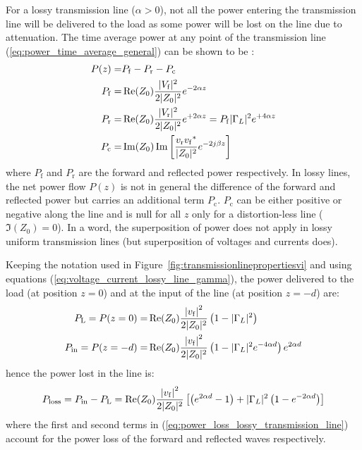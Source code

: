 For a lossy transmission line ($\alpha>0$), not all the power entering the transmission line will be delivered to the load as some power will be lost on the line due to attenuation. The time average power at any point of the transmission line (\ref{eq:power_time_average_general}) can be shown to be :
\begin{subequations}
\begin{align} 
	P(z) =& P_\mathrm{f} - P_\mathrm{r} - P_\mathrm{c} \\
	P_\mathrm{f} =& \Re(Z_0) \frac{|V_\mathrm{f}|^2}{2 |Z_0|^2} e^{-2\alpha z} \\
	P_\mathrm{r} =& \Re(Z_0) \frac{|V_\mathrm{r}|^2}{2 |Z_0|^2} e^{+2\alpha z} = P_\mathrm{f} |\Gamma_L|^2 e^{+4\alpha z} \\
	P_\mathrm{c} =& \Im(Z_0) \Im\left[\frac{{v_{\mathrm{r}}}{v_{\mathrm{f}}}^*}{|Z_0|^2} e^{-2j\beta z} \right]
\end{align}
\end{subequations}
where $P_\mathrm{f}$ and $P_\mathrm{r}$ are the forward and reflected power respectively. In lossy lines, the net power flow $P(z)$ is not in general the difference of the forward and reflected power but carries an additional term $P_\mathrm{c}$. $P_\mathrm{c}$ can be either positive or negative along the line and is null for all $z$ only for a distortion-less line ($\Im(Z_0)=0$). In a word, the superposition of power does not apply in lossy uniform transmission lines (but superposition of voltages and currents does).

Keeping the notation used in Figure~\ref{fig:transmissionlinepropertiesvi} and using equations (\ref{eq:voltage_current_lossy_line_gamma}), the power delivered to the load (at position $z=0$) and at the input of the line (at position $z=-d$) are:
\begin{subequations}
	\begin{align}
		P_{\mathrm{L}} = P(z=0) =& \Re(Z_0) \frac{\left| {v_{\mathrm{f}}} \right|^2}{2 |Z_0|^2} \left(1 - |\Gamma_L|^2 \right) \\
		P_{\mathrm{in}} = P(z=-d) =& \Re(Z_0) \frac{\left| {v_{\mathrm{f}}} \right|^2}{2 |Z_0|^2} \left(1 - |\Gamma_L|^2 e^{-4\alpha d}  \right) e^{2\alpha d}
	\end{align}
\end{subequations}
hence the power lost in the line is:
\begin{equation}
P_{\mathrm{loss}} = P_{\mathrm{in}} - P_{\mathrm{L}} 
= \Re(Z_0)  \frac{\left| {v_{\mathrm{f}}} \right|^2}{2 |Z_0|^2} 
\left[ 
\left(e^{2\alpha d} - 1\right) + |\Gamma_L|^2 \left( 1 - e^{-2\alpha d} \right)
\right]
\label{eq:power_loss_lossy_transmission_line}
\end{equation}
where the first and second terms in (\ref{eq:power_loss_lossy_transmission_line}) account for the power loss of the forward and reflected waves respectively.
	


